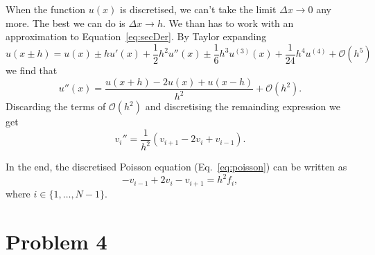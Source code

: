 \documentclass[english,notitlepage,aps,pra,10pt]{revtex4-2}
\begin{document}
When the function $u(x)$ is discretised, we can't take the limit $\Delta x \to 0$ any more. The best we can do is $\Delta x \to h$. We than has to work with an approximation to Equation~\ref{eq:secDer}. By Taylor expanding 
\begin{equation}
    u(x \pm h) = u(x) \pm h u'(x) + \frac{1}{2} h^2 u''(x) \pm \frac{1}{6} h^3 u^{(3)}(x) + \frac{1}{24} h^4 u^{(4)} + \mathcal{O}(h^5)
\end{equation}
we find that 
\begin{equation}
    u''(x) = \frac{u(x+h) - 2u(x) + u(x-h)}{h^2} + \mathcal{O}(h^2).
    \label{eq:approxDeriv}
\end{equation}
Discarding the terms of $\mathcal{O}(h^2)$ and discretising the remainding expression we get
\begin{equation}
    v_i'' = \frac{1}{h^2}(v_{i+1} - 2v_i + v_{i-1}).
\end{equation}

In the end, the discretised Poisson equation (Eq.~\ref{eq:poisson}) can be written as
\begin{equation}
    -v_{i-1} + 2v_i - v_{i+1} = h^2 f_i,
    \label{eq:discPoisson}
\end{equation} 
where $i \in \{1,\dots, N-1\}$.


\section*{Problem 4}
\end{document}

